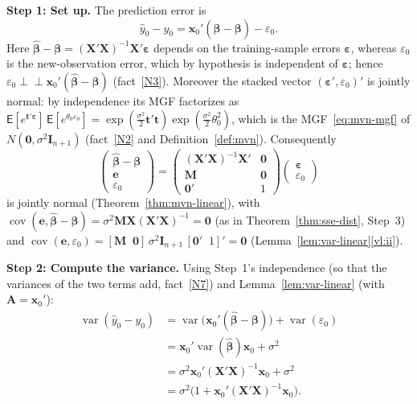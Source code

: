 \documentclass[12pt,a4paper]{article}
\makeatletter
\theoremstyle{definition}
\renewenvironment{proof}[1][\proofname]{\par
  \pushQED{\qed}%
  \normalfont \topsep6\p@\@plus6\p@\relax
  \trivlist
  \item[\hskip\labelsep\bfseries #1\@addpunct{.}]\ignorespaces
}{%
  \popQED\endtrivlist\@endpefalse
}
\newcommand\expc{\mathsf{E}}
\DeclareMathOperator\var{var}
\DeclareMathOperator\cov{cov}
\newcommand{\bX}{\mathbf{X}}
\newcommand{\bx}{\mathbf{x}}
\def\bb{\boldsymbol{\beta}}
\newcommand{\be}{\boldsymbol{\varepsilon}}
\newcommand{\bI}{\mathbf{I}}
\newcommand{\bM}{\mathbf{M}}
\newcommand{\bzero}{\mathbf{0}}
\newcommand{\bA}{\mathbf{A}}
\newcommand{\indep}{\perp\!\!\!\perp}
\makeatother
\begin{document}
\begin{proof}
\textbf{Step 1: Set up.} The prediction error is
\[
\hat{y}_0 - y_0 = \bx_0'(\hat{\bb} - \bb) - \varepsilon_0.
\]
Here $\hat{\bb} - \bb = (\bX'\bX)^{-1}\bX'\be$ depends on the training-sample errors $\be$, whereas $\varepsilon_0$ is the new-observation error, which by hypothesis is independent of $\be$; hence $\varepsilon_0 \indep \bx_0'(\hat{\bb} - \bb)$ (fact~\ref{N3}). Moreover the stacked vector $(\be', \varepsilon_0)'$ is jointly normal: by independence its MGF factorizes as $\expc[e^{\mathbf{t}'\be}]\,\expc[e^{\theta_0\varepsilon_0}] = \exp(\tfrac{\sigma^2}{2}\mathbf{t}'\mathbf{t})\exp(\tfrac{\sigma^2}{2}\theta_0^2)$, which is the MGF~\eqref{eq:mvn-mgf} of $N(\bzero, \sigma^2\bI_{n+1})$ (fact~\ref{N2} and Definition~\ref{def:mvn}). Consequently
\begin{equation}\label{eq:pred-stack}
\begin{pmatrix}\hat{\bb} - \bb \\ \mathbf{e} \\ \varepsilon_0\end{pmatrix} = \begin{pmatrix}(\bX'\bX)^{-1}\bX' & \bzero \\ \bM & \bzero \\ \bzero' & 1\end{pmatrix}\begin{pmatrix}\be \\ \varepsilon_0\end{pmatrix}
\end{equation}
is jointly normal (Theorem~\ref{thm:mvn-linear}), with $\cov(\mathbf{e}, \hat{\bb} - \bb) = \sigma^2\bM\bX(\bX'\bX)^{-1} = \bzero$ (as in Theorem~\ref{thm:sse-dist}, Step~3) and $\cov(\mathbf{e}, \varepsilon_0) = [\bM \;\; \bzero]\,\sigma^2\bI_{n+1}\,[\bzero' \;\; 1]' = \bzero$ (Lemma~\ref{lem:var-linear}\ref{vl:ii}).

\textbf{Step 2: Compute the variance.} Using Step~1's independence (so that the variances of the two terms add, fact~\ref{N7}) and Lemma~\ref{lem:var-linear} (with $\bA = \bx_0'$):
\begin{align*}
\var(\hat{y}_0 - y_0) &= \var\!\bigl(\bx_0'(\hat{\bb} - \bb)\bigr) + \var(\varepsilon_0)\\
&= \bx_0'\var(\hat{\bb})\bx_0 + \sigma^2\\
&= \sigma^2\bx_0'(\bX'\bX)^{-1}\bx_0 + \sigma^2\\
&= \sigma^2\bigl(1 + \bx_0'(\bX'\bX)^{-1}\bx_0\bigr).
\end{align*}


\end{proof}
\end{document}
